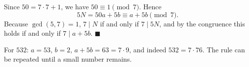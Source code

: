 Since $50=7\cdot7+1$, we have $50\equiv1\pmod7$. Hence
\[
5N=50a+5b\equiv a+5b\pmod 7 .
\]
Because $\gcd(5,7)=1$, $7\mid N$ if and only if $7\mid 5N$, and by the congruence this holds if and only if $7\mid a+5b$. $\blacksquare$

For $532$: $a=53$, $b=2$, $a+5b=63=7\cdot9$, and indeed $532=7\cdot76$. The rule can be repeated until a small number remains.
